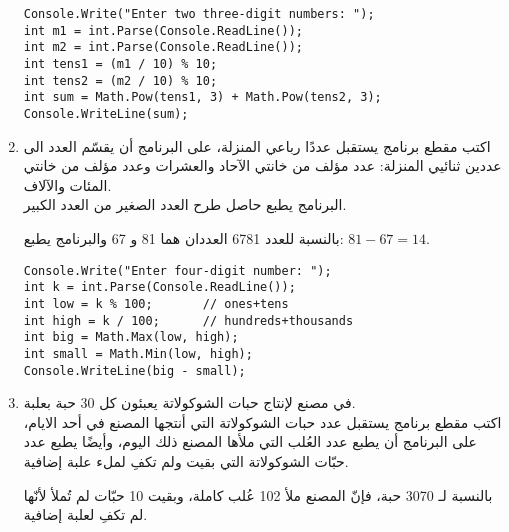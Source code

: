 ﻿\documentclass[12pt]{article}
\begin{document}
\begin{enumerate}[itemsep=2em]
\ifwithsols
\begin{boxSolution}
\begin{english}
\begin{verbatim}
Console.Write("Enter two three-digit numbers: ");
int m1 = int.Parse(Console.ReadLine());
int m2 = int.Parse(Console.ReadLine());
int tens1 = (m1 / 10) % 10;
int tens2 = (m2 / 10) % 10;
int sum = Math.Pow(tens1, 3) + Math.Pow(tens2, 3);
Console.WriteLine(sum);
\end{verbatim}
\end{english}
\end{boxSolution}
\fi

    \item
    اكتب مقطع برنامج يستقبل عددًا رباعي المنزلة، على البرنامج أن يقسّم العدد الى عددين ثنائيي المنزلة: عدد مؤلف من خانتي الآحاد والعشرات وعدد مؤلف من خانتي المئات والآلاف. \\
    البرنامج يطبع حاصل طرح العدد الصغير من العدد الكبير. \\
    \begin{boxExample}
        بالنسبة للعدد 6781 العددان هما 81 و 67 والبرنامج يطبع: $81 - 67 = 14$.
    \end{boxExample}

\ifwithsols
\begin{boxSolution}
\begin{english}
\begin{verbatim}
Console.Write("Enter four-digit number: ");
int k = int.Parse(Console.ReadLine());
int low = k % 100;       // ones+tens
int high = k / 100;      // hundreds+thousands
int big = Math.Max(low, high);
int small = Math.Min(low, high);
Console.WriteLine(big - small);
\end{verbatim}
\end{english}
\end{boxSolution}
\fi

\clearpage
    \item
    في مصنع لإنتاج حبات الشوكولاتة يعبئون كل 30 حبة بعلبة. \\
    اكتب مقطع برنامج يستقبل عدد حبات الشوكولاتة التي أنتجها المصنع في أحد الايام، على البرنامج أن يطبع عدد العُلب التي ملأها المصنع ذلك اليوم، وأيضًا يطبع عدد حبّات الشوكولاتة التي بقيت ولم تكفِ لملء علبة إضافية. \\
    \begin{boxExample}
        بالنسبة لـ 3070 حبة، فإنّ المصنع ملأ 102 عُلب كاملة، وبقيت 10 حبّات لم تُملأ لأنّها لم تكفِ لعلبة إضافية.
    \end{boxExample}


\end{enumerate}
\end{document}
